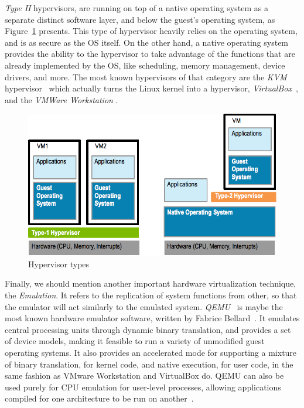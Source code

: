 \emph{Type II} hypervisors, are running on top of a native operating system as a
separate distinct software layer, and below the guest's operating system, as
Figure~\ref{fig:hypervisors} presents. This type of hypervisor heavily
relies on the operating system, and is as secure as the OS itself.
On the other hand, a native operating system provides the ability to the
hypervisor to take advantage of the functions that are already implemented by
the OS, like scheduling, memory management, device drivers, and more.
The most known hypervisors of that category are the \emph{KVM}
hypervisor~ which actually turns the Linux
kernel into a hypervisor, \emph{VirtualBox}~,
and the \emph{VMWare Workstation}
.

\begin{figure}[htbp]
  \begin{center}
    \includegraphics[width=0.8\maxwidth]{../figures/type1-vs-2.png}
    \caption{Hypervisor types\label{fig:hypervisors}}
   \end{center}
\end{figure}

Finally, we should mention another important hardware virtualization technique,
the \emph{Emulation}. It refers to the replication of system functions from
other, so that the emulator will act similarly to the emulated system.
\emph{QEMU}~ is maybe the most known hardware
emulator software, written by Fabrice Bellard~\cite{bellard}. It emulates central
processing units through dynamic binary translation, and provides a set of device
models, making it feasible to run a variety of unmodified guest operating systems.
It also provides an accelerated mode for supporting a mixture of binary
translation, for kernel code, and native execution, for user code, in the same
fashion as VMware Workstation and VirtualBox do. QEMU can also be used purely for
CPU emulation for user-level processes, allowing applications compiled for one
architecture to be run on another~.

